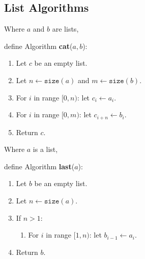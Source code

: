 
\subsection{List Algorithms}

 \begin{framed}

  Where $a$ and $b$ are lists,

 \vspace{12pt}

  define Algorithm \textbf{cat}($a, b$):
 
  \begin{enumerate}
    \item Let $c$ be an empty list.
    \item Let $n \leftarrow \texttt{size}(a)$ and $m \leftarrow \texttt{size}(b)$.
    \item For $i$ in range $[0, n)$: let $c_i   \leftarrow a_i$.
    \item For $i$ in range $[0, m)$: let $c_{i+n} \leftarrow b_i$.
    \item Return $c$.
  \end{enumerate} 

 \end{framed}

 \begin{framed}

  Where $a$ is a list,

 \vspace{12pt}

 define Algorithm \textbf{last}($a$):
 
  \begin{enumerate}
    \item Let $b$ be an empty list.
    \item Let $n \leftarrow \texttt{size}(a)$.
    \item If $n > 1$:
    \begin{enumerate} 
      \item For $i$ in range $[1, n)$: let $b_{i-1} \leftarrow a_i$.
    \end{enumerate} 
    \item Return $b$.
  \end{enumerate} 

 \end{framed}

